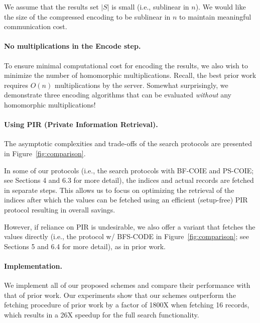 We assume that the results set $|S|$ is small (i.e., sublinear in $n$).
%
We would like the size of the compressed encoding to be sublinear in $n$ to
maintain meaningful communication cost. 

\paragraph{No multiplications in the Encode step.} 
To ensure minimal computational cost for encoding the results, we also wish to
minimize the number of homomorphic multiplications.  Recall, the best prior
work requires $O(n)$ multiplications by the server.  Somewhat surprisingly, we
demonstrate three encoding algorithms that can be evaluated {\em without} any
homomorphic multiplications! 


\paragraph{Using PIR (Private Information Retrieval).} 
The asymptotic complexities and trade-offs of the search protocols are presented in
Figure~\ref{fig:comparison}.

In some of our
protocols (i.e., the search protocols with BF-COIE and PS-COIE; see Sections 4 and 6.3 for more detail), the indices and actual records are fetched in separate steps.  This allows us to focus on optimizing the retrieval of the indices after which the values can be fetched using an efficient (setup-free) PIR protocol resulting in overall savings.  

However, if reliance on PIR is undesirable, we also offer a variant that fetches the values directly (i.e., the protocol w/ BFS-CODE in Figure~\ref{fig:comparison}; see Sections 5 and 6.4 for more detail), as in prior work.



\paragraph{Implementation.} We implement all of our proposed schemes and
compare their performance with that of prior work. Our experiments show
that our schemes outperform the fetching procedure of prior work by a
factor of 1800X when fetching 16 records, which results in a 26X speedup
for the full search functionality.


